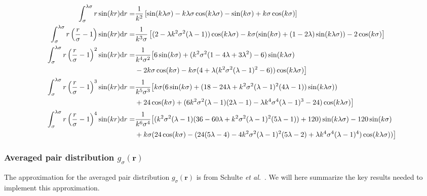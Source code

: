 \documentclass[letterpaper,twocolumn,amsmath,amssymb,pre,aps,10pt]{revtex4-1}
\newcommand\rr{\mathbf{r}}
\begin{document}
\begin{widetext}
\begin{align}
  \int_\sigma^{\lambda \sigma} r \sin (kr) \mathrm{d}r =&
  \frac{1}{k^2}\left[ \sin (k\lambda\sigma) - k\lambda\sigma
    \cos (k\lambda\sigma) - \sin (k\sigma) + k\sigma \cos (k\sigma) \right]\\
  \int_\sigma^{\lambda \sigma} r
 \left( \frac{r}{\sigma}-1\right) \sin (kr) \mathrm{d}r =&
 \frac{1}{k^3 \sigma}\left[(2-\lambda k^2
 \sigma^2(\lambda-1))\cos(k\lambda\sigma)-k\sigma(\sin(k\sigma)
 +(1-2\lambda) \sin(k\lambda\sigma)) -2\cos(k\sigma) \right] \\
  \int_\sigma^{\lambda \sigma} r
 \left( \frac{r}{\sigma}-1\right)^2 \sin (kr) \mathrm{d}r =&
 \frac{1}{k^4\sigma^2} \big[
 6\sin(k\sigma)+(k^2\sigma^2(1-4\lambda+3\lambda^2)
 -6)\sin(k\lambda\sigma) \notag \\
 &-2k\sigma\cos(k\sigma) - k\sigma(4 +
 \lambda(k^2\sigma^2(\lambda-1)^2 - 6))\cos(k\lambda\sigma)\big] \\
  \int_\sigma^{\lambda \sigma} r
 \left( \frac{r}{\sigma}-1\right)^3 \sin (kr) \mathrm{d}r =&
 \frac{1}{k^5\sigma^3} \big[k\sigma(6\sin(k\sigma) + (18-24\lambda
   +k^2\sigma^2(\lambda-1)^2(4\lambda-1))\sin(k\lambda\sigma)) \notag \\
   &+24\cos(k\sigma) + (6k^2\sigma^2(\lambda-1)(2\lambda-1)-\lambda
   k^4\sigma^4(\lambda-1)^3-24)\cos(k\lambda\sigma)\big] \\
  \int_\sigma^{\lambda \sigma} r
 \left( \frac{r}{\sigma}-1\right)^4 \sin (kr) \mathrm{d}r =&
 \frac{1}{k^6\sigma^4}
 \big[(k^2\sigma^2(\lambda-1)(36-60\lambda+k^2\sigma^2(\lambda - 1)^2(5\lambda-1))
   + 120)\sin(k\lambda\sigma) - 120\sin(k\sigma) \notag \\
   &+k\sigma(24\cos(k\sigma) -
   (24(5\lambda-4)-4k^2\sigma^2(\lambda-1)^2 (5\lambda-2) +
   \lambda k^4\sigma^4(\lambda-1)^4)\cos(k\lambda\sigma)) \big]
\end{align}
\end{widetext}
\subsubsection{Averaged pair distribution  $g_\sigma(\rr)$}

The approximation for the averaged pair distribution $g_\sigma(\rr)$
is from Schulte \emph{et al.}~\cite{schulte2012using}.  We will here
summarize the key results needed to implement this approximation.

\end{document}
